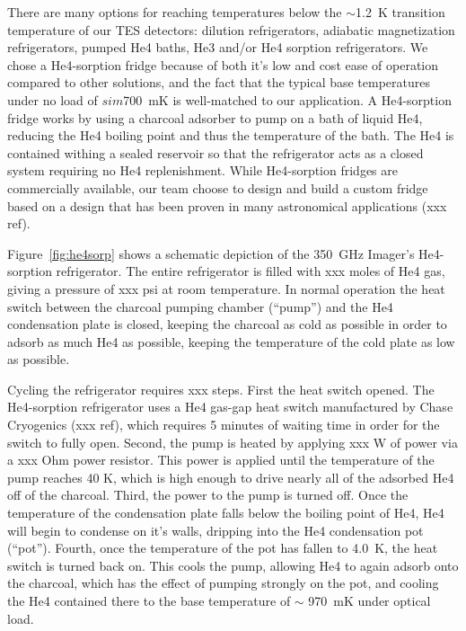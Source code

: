 \documentclass[10pt,twocolumn,article]{memoir} %
\newcommand{\figref}[1]{Figure~\ref{#1}}
\newcommand{\TES}{{\small TES}\xspace}
\newcommand{\He}[1]{He#1\xspace}
\begin{document}
There are many options for reaching temperatures below the $\sim$1.2~K transition temperature of our \TES detectors: dilution refrigerators, adiabatic magnetization refrigerators, pumped \He4 baths, \He3 and/or \He4 sorption refrigerators.
We chose a \He4-sorption fridge because of both it's low and cost ease of operation compared to other solutions, and the fact that the typical base temperatures under no load of $sim$700~mK is well-matched to our application.
A  \He4-sorption fridge works by using a charcoal adsorber to pump on a bath of liquid \He4, reducing the \He4 boiling point and thus the temperature of the bath.
The \He4 is contained withing a sealed reservoir so that the refrigerator acts as a closed system requiring no \He4 replenishment. 
While \He4-sorption fridges are commercially available, our team choose to design and build a custom fridge based on a design that has been proven in many astronomical applications (xxx ref).

\figref{fig:he4sorp} shows a schematic depiction of the 350~GHz Imager's \He4-sorption refrigerator.
The entire refrigerator is filled with xxx moles of \He4 gas, giving a pressure of xxx psi at room temperature.
In normal operation the heat switch between the charcoal pumping chamber (``pump'') and the \He4 condensation plate is closed, keeping the charcoal as cold as possible in order to adsorb as much \He4 as possible, keeping the temperature of the cold plate as low as possible.

Cycling the refrigerator requires xxx steps. First the heat switch opened.
The \He4-sorption refrigerator uses a \He4 gas-gap heat switch manufactured by Chase Cryogenics (xxx ref), which requires 5 minutes of waiting time in order for the switch to fully open.
Second, the pump is heated by applying xxx W of power via a xxx Ohm power resistor.
This power is applied until the temperature of the pump reaches 40 K, which is high enough to drive nearly all of the adsorbed \He4 off of the charcoal.
Third, the power to the pump is turned off.
Once the temperature of the condensation plate falls below the boiling point of \He4, \He4 will begin to condense on it's walls, dripping into the \He4 condensation pot (``pot'').
Fourth, once the temperature of the pot has fallen to 4.0~K, the heat switch is turned back on. This cools the pump, allowing \He4 to again adsorb onto the charcoal, which has the effect of pumping strongly on the pot, and cooling the \He4 contained there to the base temperature of $\sim$ 970~mK under optical load.
\end{document}
